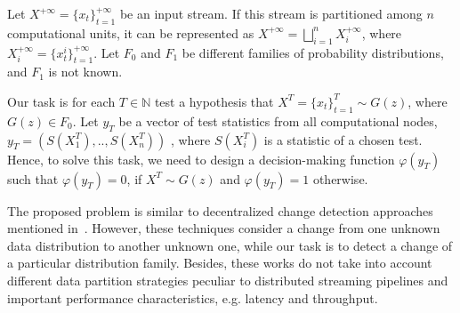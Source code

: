 \label {fs-short-model}

Let $X^{+\infty}=\{x_t\}_{t=1}^{+\infty}$ be an input stream. If this stream is partitioned among $n$ computational units, it can be represented as $X^{+\infty}=\bigsqcup_{i=1}^n X_i^{+\infty}$, where $X_i^{+\infty}=\{x_t^i\}_{t=1}^{+\infty}$. Let $F_0$ and $F_1$ be different families of probability distributions, and $F_1$ is not known. 

Our task is for each $T\in \mathbb{N}$ test a hypothesis that $X^T=\{x_t\}_{t=1}^{T} \sim G(z)$, where $G(z) \in F_0$. Let $y_T$ be a vector of test statistics from all computational nodes,  $y_T = (S(X_1^T),..,S(X_n^T))$ , where $S(X_i^T)$ is a statistic of a chosen test. Hence, to solve this task, we need to design a decision-making function $\varphi(y_T)$ such that $\varphi(y_T) = 0$, if $X^T \sim G(z)$  and $\varphi(y_T) = 1$ otherwise.

The proposed problem is similar to decentralized change detection approaches mentioned in~\cite{tartakovsky2008asymptotically, tran2014change}. However, these techniques consider a change from one unknown data distribution to another unknown one, while our task is to detect a change of a particular distribution family. Besides, these works do not take into account different data partition strategies peculiar to distributed streaming pipelines and important performance characteristics, e.g. latency and throughput.